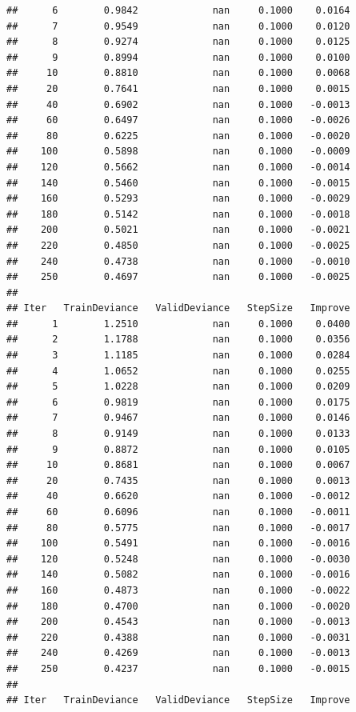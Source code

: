 \documentclass[
]{book}
\begin{document}
\begin{verbatim}
##      6        0.9842             nan     0.1000    0.0164
##      7        0.9549             nan     0.1000    0.0120
##      8        0.9274             nan     0.1000    0.0125
##      9        0.8994             nan     0.1000    0.0100
##     10        0.8810             nan     0.1000    0.0068
##     20        0.7641             nan     0.1000    0.0015
##     40        0.6902             nan     0.1000   -0.0013
##     60        0.6497             nan     0.1000   -0.0026
##     80        0.6225             nan     0.1000   -0.0020
##    100        0.5898             nan     0.1000   -0.0009
##    120        0.5662             nan     0.1000   -0.0014
##    140        0.5460             nan     0.1000   -0.0015
##    160        0.5293             nan     0.1000   -0.0029
##    180        0.5142             nan     0.1000   -0.0018
##    200        0.5021             nan     0.1000   -0.0021
##    220        0.4850             nan     0.1000   -0.0025
##    240        0.4738             nan     0.1000   -0.0010
##    250        0.4697             nan     0.1000   -0.0025
## 
## Iter   TrainDeviance   ValidDeviance   StepSize   Improve
##      1        1.2510             nan     0.1000    0.0400
##      2        1.1788             nan     0.1000    0.0356
##      3        1.1185             nan     0.1000    0.0284
##      4        1.0652             nan     0.1000    0.0255
##      5        1.0228             nan     0.1000    0.0209
##      6        0.9819             nan     0.1000    0.0175
##      7        0.9467             nan     0.1000    0.0146
##      8        0.9149             nan     0.1000    0.0133
##      9        0.8872             nan     0.1000    0.0105
##     10        0.8681             nan     0.1000    0.0067
##     20        0.7435             nan     0.1000    0.0013
##     40        0.6620             nan     0.1000   -0.0012
##     60        0.6096             nan     0.1000   -0.0011
##     80        0.5775             nan     0.1000   -0.0017
##    100        0.5491             nan     0.1000   -0.0016
##    120        0.5248             nan     0.1000   -0.0030
##    140        0.5082             nan     0.1000   -0.0016
##    160        0.4873             nan     0.1000   -0.0022
##    180        0.4700             nan     0.1000   -0.0020
##    200        0.4543             nan     0.1000   -0.0013
##    220        0.4388             nan     0.1000   -0.0031
##    240        0.4269             nan     0.1000   -0.0013
##    250        0.4237             nan     0.1000   -0.0015
## 
## Iter   TrainDeviance   ValidDeviance   StepSize   Improve

\end{verbatim}
\end{document}
